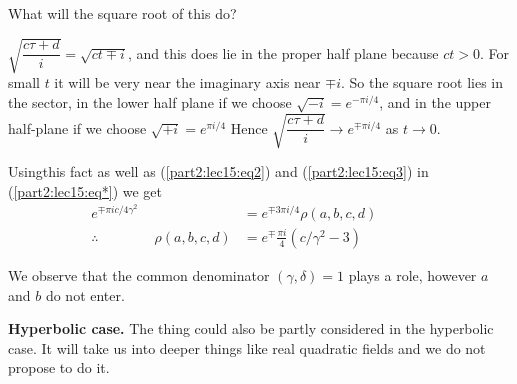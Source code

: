 What will the square root of this do?

\medskip
\noindent 
\begin{minipage}[c]{4.5cm}
  $\sqrt{\dfrac{c \tau+d}{i}} = \sqrt{ct\mp i}$, and this does lie in
  the proper half plane because $ct > 0$. For small $t$ it will be very
  near the imaginary axis near $\mp i$. So the square root lies in the
  sector, in the lower half plane if we choose $\sqrt{-i} = e^{- \pi
    i/4}$, and in the upper half-plane if we choose $\sqrt{+i}= e^{\pi i/4
  }$ Hence $\sqrt{\dfrac{c \tau +d}{i}}\to e^{\mp \pi i/4}$ as $t \to
  0$. 
\end{minipage}
\begin{minipage}[c]{5.5cm}
  \begin{figure}[H]
  \end{figure}
\end{minipage}

Using\pageoriginale this fact as well as (\ref{part2:lec15:eq2}) and
(\ref{part2:lec15:eq3}) in (\ref{part2:lec15:eq*}) we get 
\begin{align*}
  e^{\mp \pi i c/4\gamma^2} & = e^{\mp 3 \pi i /4} \rho (a, b, c, d)\\
  \therefore \qquad\qquad  \rho (a, b, c, d) & = e^{\mp} \frac{\pi i}{4}
  (c/\gamma^2-3)\hspace{2cm} 
\end{align*}

We observe that the common denominator $(\gamma, \delta)=1$ plays a
role, however $a$ and $b$ do not enter.

\medskip
\noindent \textbf{Hyperbolic case.} The thing could also be partly
considered in the hyperbolic case. It will take us into deeper things
like real quadratic fields and we do not propose to do it.

